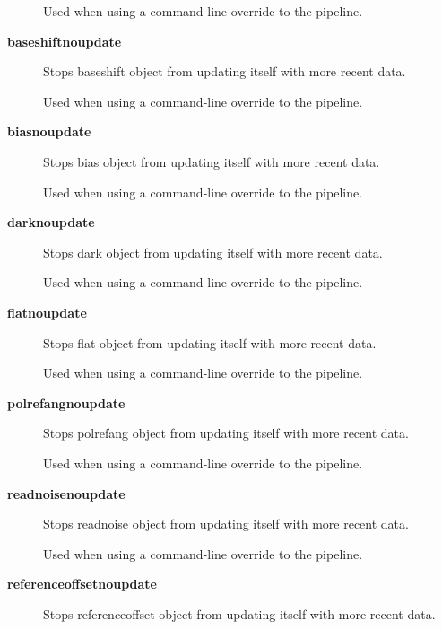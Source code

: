 \begin{description}
Used when using a command-line override to the pipeline.


\item[{\textbf{baseshiftnoupdate}}] \mbox{}

Stops baseshift object from updating itself with more recent data.



Used when using a command-line override to the pipeline.


\item[{\textbf{biasnoupdate}}] \mbox{}

Stops bias object from updating itself with more recent data.



Used when using a command-line override to the pipeline.


\item[{\textbf{darknoupdate}}] \mbox{}

Stops dark object from updating itself with more recent data.



Used when using a command-line override to the pipeline.


\item[{\textbf{flatnoupdate}}] \mbox{}

Stops flat object from updating itself with more recent data.



Used when using a command-line override to the pipeline.


\item[{\textbf{polrefangnoupdate}}] \mbox{}

Stops polrefang object from updating itself with more recent data.



Used when using a command-line override to the pipeline.


\item[{\textbf{readnoisenoupdate}}] \mbox{}

Stops readnoise object from updating itself with more recent data.



Used when using a command-line override to the pipeline.


\item[{\textbf{referenceoffsetnoupdate}}] \mbox{}

Stops referenceoffset object from updating itself with more recent data.




\end{description}
